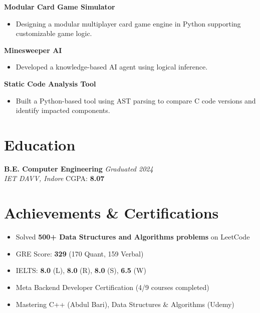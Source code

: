 \documentclass[a4paper,10pt]{article}
\begin{document}
\noindent\textbf{Modular Card Game Simulator}
\begin{itemize}
    \item Designing a modular multiplayer card game engine in Python supporting customizable game logic.
\end{itemize}

\noindent\textbf{Minesweeper AI}
\begin{itemize}
    \item Developed a knowledge-based AI agent using logical inference.
\end{itemize}

\noindent\textbf{Static Code Analysis Tool}
\begin{itemize}
    \item Built a Python-based tool using AST parsing to compare C code versions and identify impacted components.
\end{itemize}

\section*{Education}

\noindent
\textbf{B.E. Computer Engineering} \hfill \textit{Graduated 2024} \\
\textit{IET DAVV, Indore} \hfill CGPA: \textbf{8.07}

\section*{Achievements \& Certifications}

\begin{itemize}
    \item Solved \textbf{500+ Data Structures and Algorithms problems} on LeetCode
    \item GRE Score: \textbf{329} (170 Quant, 159 Verbal)
    \item IELTS: \textbf{8.0} (L), \textbf{8.0} (R), \textbf{8.0} (S), \textbf{6.5} (W)
    \item Meta Backend Developer Certification (4/9 courses completed)
    \item Mastering C++ (Abdul Bari), Data Structures \& Algorithms (Udemy)
\end{itemize}
\end{document}
